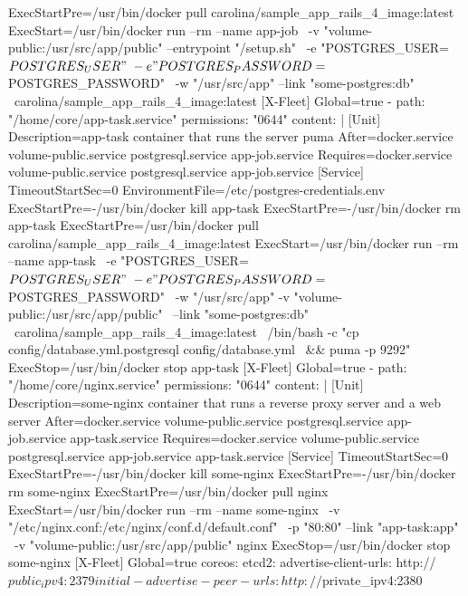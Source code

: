 \begin{codelisting}
\begin{code}
      ExecStartPre=/usr/bin/docker pull carolina/sample_app_rails_4_image:latest 
      ExecStart=/usr/bin/docker run --rm --name app-job \
      -v "volume-public:/usr/src/app/public" --entrypoint "/setup.sh" \
      -e "POSTGRES_USER=${POSTGRES_USER}" \
      -e "POSTGRES_PASSWORD=${POSTGRES_PASSWORD}" \
      -w "/usr/src/app" --link "some-postgres:db" \
      carolina/sample_app_rails_4_image:latest
      [X-Fleet]
      Global=true
  - path: "/home/core/app-task.service"
    permissions: "0644"
    content: |
      [Unit] 
      Description=app-task container that runs the server puma
      After=docker.service volume-public.service postgresql.service 
            app-job.service
      Requires=docker.service volume-public.service postgresql.service 
               app-job.service
      [Service] 
      TimeoutStartSec=0 
      EnvironmentFile=/etc/postgres-credentials.env
      ExecStartPre=-/usr/bin/docker kill app-task 
      ExecStartPre=-/usr/bin/docker rm app-task
      ExecStartPre=/usr/bin/docker pull carolina/sample_app_rails_4_image:latest 
      ExecStart=/usr/bin/docker run --rm --name app-task \
      -e "POSTGRES_USER=${POSTGRES_USER}" \
      -e "POSTGRES_PASSWORD=${POSTGRES_PASSWORD}" \
      -w "/usr/src/app" -v "volume-public:/usr/src/app/public" \
      --link "some-postgres:db" \
      carolina/sample_app_rails_4_image:latest \
      /bin/bash -c "cp config/database.yml.postgresql config/database.yml \
                    && puma -p 9292"
      ExecStop=/usr/bin/docker stop app-task
      [X-Fleet]
      Global=true
  - path: "/home/core/nginx.service"
    permissions: "0644"
    content: |
      [Unit] 
      Description=some-nginx container that runs a reverse proxy server and a 
                  web server
      After=docker.service volume-public.service postgresql.service 
            app-job.service app-task.service
      Requires=docker.service volume-public.service postgresql.service 
               app-job.service app-task.service
      [Service] 
      TimeoutStartSec=0 
      ExecStartPre=-/usr/bin/docker kill some-nginx 
      ExecStartPre=-/usr/bin/docker rm some-nginx
      ExecStartPre=/usr/bin/docker pull nginx 
      ExecStart=/usr/bin/docker run --rm --name some-nginx \
      -v "/etc/nginx.conf:/etc/nginx/conf.d/default.conf" \
      -p "80:80" --link "app-task:app" \
      -v "volume-public:/usr/src/app/public" nginx 
      ExecStop=/usr/bin/docker stop some-nginx
      [X-Fleet]
      Global=true
coreos:
  etcd2:
    advertise-client-urls: http://$public_ipv4:2379
    initial-advertise-peer-urls: http://$private_ipv4:2380

\end{code}
\end{codelisting}
